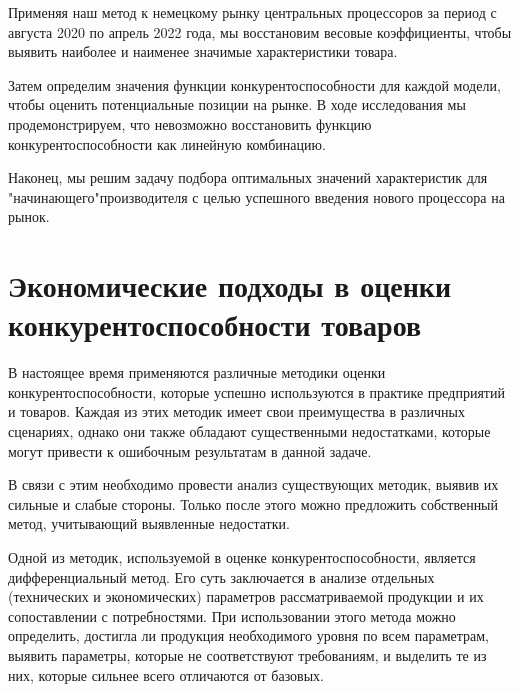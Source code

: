 \documentclass[14pt, a4paper]{extarticle}
\begin{document}
  Применяя наш метод к немецкому рынку центральных процессоров за период с
  августа 2020 по апрель 2022 года, мы восстановим весовые коэффициенты,
  чтобы выявить наиболее и наименее значимые характеристики товара.
  
  Затем определим значения функции конкурентоспособности для каждой
  модели, чтобы оценить потенциальные позиции на рынке. В ходе
  исследования мы продемонстрируем, что невозможно восстановить функцию
  конкурентоспособности как линейную комбинацию.
  
  Наконец, мы решим задачу подбора оптимальных значений характеристик для
  "начинающего"производителя с целью успешного введения нового процессора
  на рынок.

  \newpage


  \section{Экономические подходы в оценки конкурентоспособности товаров}
  В настоящее время применяются различные методики оценки
  конкурентоспособности, которые успешно используются в практике
  предприятий и товаров. Каждая из этих методик имеет свои преимущества в
  различных сценариях, однако они также обладают существенными
  недостатками, которые могут привести к ошибочным результатам в данной
  задаче.
  
  В связи с этим необходимо провести анализ существующих методик, выявив
  их сильные и слабые стороны. Только после этого можно предложить
  собственный метод, учитывающий выявленные недостатки.
  
  Одной из методик, используемой в оценке конкурентоспособности, является
  дифференциальный метод. Его суть заключается в анализе отдельных
  (технических и экономических) параметров рассматриваемой продукции и их
  сопоставлении с потребностями. При использовании этого метода можно
  определить, достигла ли продукция необходимого уровня по всем
  параметрам, выявить параметры, которые не соответствуют требованиям, и
  выделить те из них, которые сильнее всего отличаются от базовых.
\end{document}
